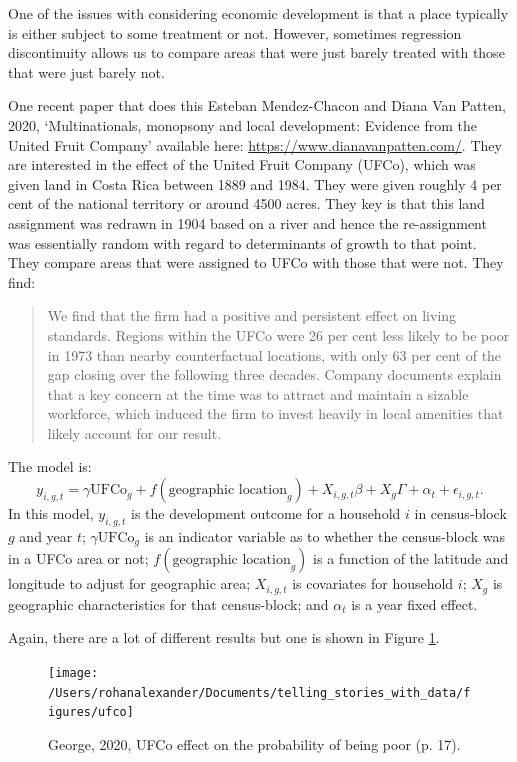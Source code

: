 \documentclass[
]{book}
\begin{document}
One of the issues with considering economic development is that a place typically is either subject to some treatment or not. However, sometimes regression discontinuity allows us to compare areas that were just barely treated with those that were just barely not.

One recent paper that does this Esteban Mendez-Chacon and Diana Van Patten, 2020, `Multinationals, monopsony and local development: Evidence from the United Fruit Company' available here: \url{https://www.dianavanpatten.com/}. They are interested in the effect of the United Fruit Company (UFCo), which was given land in Costa Rica between 1889 and 1984. They were given roughly 4 per cent of the national territory or around 4500 acres. They key is that this land assignment was redrawn in 1904 based on a river and hence the re-assignment was essentially random with regard to determinants of growth to that point. They compare areas that were assigned to UFCo with those that were not. They find:

\begin{quote}
We find that the firm had a positive and persistent effect on living standards. Regions within the UFCo were 26 per cent less likely to be poor in 1973 than nearby counterfactual locations, with only 63 per cent of the gap closing over the following three decades. Company documents explain that a key concern at the time was to attract and maintain a sizable workforce, which induced the firm to invest heavily in local amenities that likely account for our result.
\end{quote}

The model is:
\[y_{i,g,t} = \gamma\mbox{UFCo}_g + f(\mbox{geographic location}_g) + X_{i,g,t}\beta + X_g\Gamma + \alpha_t + \epsilon_{i,g,t}.\]
In this model, \(y_{i,g,t}\) is the development outcome for a household \(i\) in census-block \(g\) and year \(t\); \(\gamma\mbox{UFCo}_g\) is an indicator variable as to whether the census-block was in a UFCo area or not; \(f(\mbox{geographic location}_g)\) is a function of the latitude and longitude to adjust for geographic area; \(X_{i,g,t}\) is covariates for household \(i\); \(X_g\) is geographic characteristics for that census-block; and \(\alpha_t\) is a year fixed effect.

Again, there are a lot of different results but one is shown in Figure \ref{fig:ufco}.

\begin{figure}
\texttt{[image: /Users/rohanalexander/Documents/telling\_stories\_with\_data/figures/ufco]} \caption{George, 2020, UFCo effect on the probability of being poor (p. 17).}\label{fig:ufco}
\end{figure}
\end{document}
